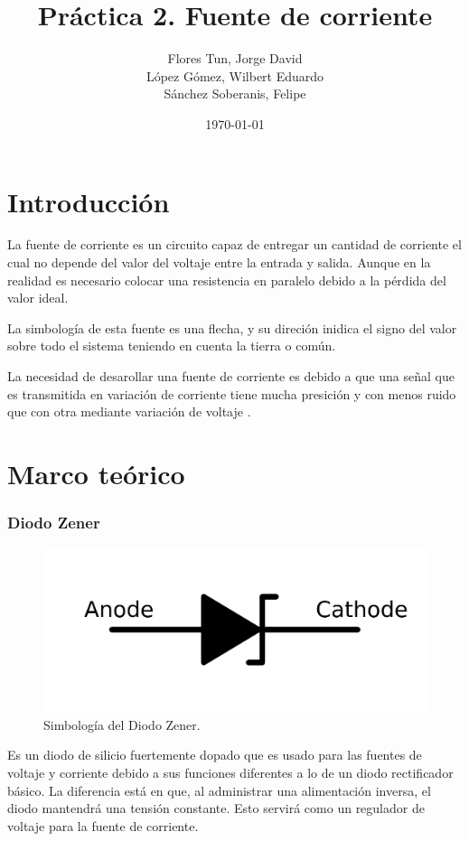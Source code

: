 \documentclass{article}
\title{Práctica 2. Fuente de corriente}
\author{Flores Tun, Jorge David\\ López Gómez, Wilbert Eduardo\\ Sánchez Soberanis, Felipe}
\date{\today}
\begin{document}
\maketitle

\tableofcontents

\section{Introducción}
La fuente de corriente es un circuito capaz de entregar un cantidad de corriente el cual no depende del valor del voltaje entre la entrada y salida. Aunque en la realidad es necesario colocar una resistencia en paralelo debido a la pérdida del valor ideal.

La simbología de esta fuente es una flecha, y su direción inidica el signo del valor sobre todo el sistema teniendo en cuenta la tierra o común.

La necesidad de desarollar una fuente de corriente es debido a que una señal que es transmitida en variación de corriente tiene mucha presición y con menos ruido que con otra mediante variación de voltaje \parencite{routimo2007comparison}.

\section{Marco teórico}
\subsubsection*{Diodo Zener}

\begin{figure}[h]
    \centering
    \includegraphics[scale=0.2]{1024px-Zener_diode_symbol.svg.png}    
    \caption{Simbología del Diodo Zener.}
    \label{Fig: Simbologia del Diodo Zener}
\end{figure}


Es un diodo de silicio fuertemente dopado que es usado para las fuentes de voltaje y corriente debido a sus funciones 
diferentes a lo de un diodo rectificador básico. La diferencia está en que, al administrar una alimentación inversa, 
el diodo mantendrá una tensión constante. Esto servirá como un regulador de voltaje para la fuente de corriente.
\end{document}
